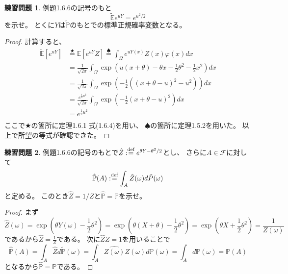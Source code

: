 \documentclass[uplatex]{jsarticle}
\theoremstyle{definition}
\newtheorem{prob}[prob]{練習問題}
\def\P{\mathbb{P}}
\def\E{\mathbb{E}}
\def\mcF{\mathcal{F}}
\def\dfn{:\overset{\mbox{{\scriptsize def}}}{=}}
\begin{document}
\begin{prob}\label{prob: 1.11}
  例題1.6.6の記号のもと
  \[
  \tilde{\E}e^{uY} = e^{u^2/2}
  \]
  を示せ。
  とくに\(Y\)は\(\tilde{\P}\)のもとでの標準正規確率変数となる。
\end{prob}

\begin{proof}
  計算すると、
  \begin{align*}
    \tilde{\E}[e^{uY}]
    &\overset{\bigstar}{=} \E[e^{uY}Z]
    \overset{\spadesuit}{=} \int_{\Omega}e^{uY(x)}Z(x)\varphi(x)dx \\
    &= \frac{1}{\sqrt{2\pi}}\int_{\Omega}\exp(u(x+\theta) - \theta x
    - \frac{1}{2}\theta^2 - \frac{1}{2}x^2)dx \\
    &= \frac{1}{\sqrt{2\pi}}\int_{\Omega}\exp(
    -\frac{1}{2}((x+\theta-u)^2 - u^2))dx \\
    &= \frac{e^{\frac{1}{2}u^2}}{\sqrt{2\pi}}
    \int_{\Omega}\exp(-\frac{1}{2}(x+\theta-u)^2)dx \\
    &= e^{\frac{1}{2}u^2} \\
  \end{align*}
  ここで\(\bigstar\)の箇所に定理1.6.1 式(1.6.4)を用い、
  \(\spadesuit\)の箇所に定理1.5.2を用いた。
  以上で所望の等式が確認できた。
\end{proof}

\begin{prob}\label{prob: 1.12}
  例題1.6.6の記号のもとで\(\hat{Z} \dfn e^{\theta Y-\theta^2/2}\)とし、
  さらに\(A\in \mcF\)に対して
  \[
  \hat{\P}(A) \dfn \int_A\hat{Z}(\omega)d\tilde{P}(\omega)
  \]
  と定める。
  このとき\(\hat{Z} = 1/Z\)と\(\hat{\P}=\P\)を示せ。
\end{prob}

\begin{proof}
  まず
  \[
  \hat{Z}(\omega) = \exp(\theta Y(\omega) - \frac{1}{2}\theta^2)
  = \exp(\theta(X+\theta) - \frac{1}{2}\theta^2)
  = \exp(\theta X + \frac{1}{2}\theta^2) = \frac{1}{Z(\omega)}
  \]
  であるから\(\hat{Z} = \frac{1}{Z}\)である。
  次に\(\hat{Z}Z=1\)を用いることで
  \[
  \hat{\P}(A) = \int_A\hat{Z}d\tilde{\P}(\omega)
  = \int_A\hat{Z(\omega)}Z(\omega)d\P(\omega)
  = \int_Ad\P(\omega) = \P(A)
  \]
  となるから\(\hat{\P}=\P\)である。
\end{proof}
\end{document}
